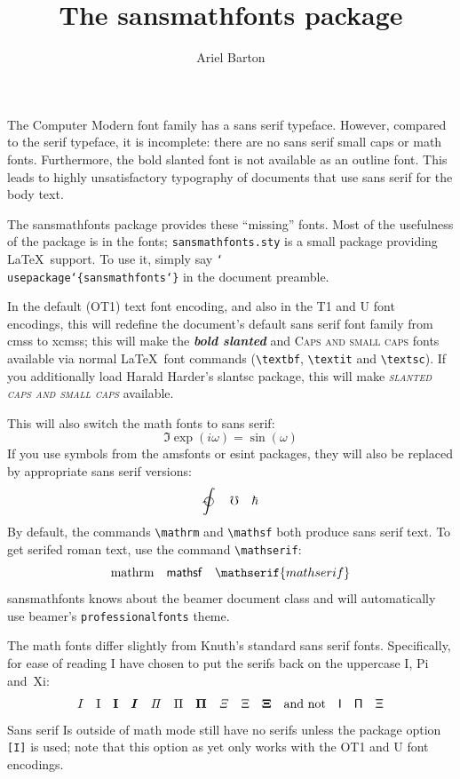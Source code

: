 \documentclass{amsart}
\title{The \textsf{sansmathfonts} package}
\author{Ariel Barton}
\begin{document}
\maketitle



The Computer Modern font family has a sans serif typeface. However, compared to the serif typeface, it is incomplete: there are no sans serif small caps or math fonts. Furthermore, the bold slanted font is not available as an outline font.
This leads to highly unsatisfactory typography of documents that use sans serif for the body text.


The \textsf{sansmathfonts} package provides these ``missing'' fonts. Most of the usefulness of the package is in the fonts; \texttt{sansmathfonts.sty} is a small package providing \LaTeX\ support. To use it, simply say \texttt{\char`\\usepackage\char`\{sansmathfonts\char`\}} in the document preamble.

In the default (OT1) text font encoding, and also in the T1 and U font encodings, this will redefine the document's default sans serif font family from \textsf{cmss} to \textsf{xcmss}; this will make the \textsf{\textbf{\textit{bold slanted}}} and \textsf{\textsc{Caps and small caps}} fonts available via normal \LaTeX\ font commands (\verb|\textbf|, \verb|\textit| and \verb|\textsc|). If you additionally load Harald Harder's \textsf{slantsc} package, this will make \textsf{\textit{\textsc{slanted caps and small caps}}} available.

This will also switch the math fonts to sans serif:
\[\Im \mathop{\mathrm{exp}}(i\omega)=\sin(\omega) \]
If you use symbols from the \textsf{amsfonts} or \textsf{esint} packages, they will also be replaced by appropriate sans serif versions:
\[\ointclockwise \quad \mho \quad \hbar\]
By default, the commands \verb|\mathrm| and \verb|\mathsf| both produce sans serif text. To get serifed roman text, use the command \verb|\mathserif|:
\[\mathrm{mathrm}\quad\mathsf{mathsf}\quad\mathserif{mathserif}\]
\textsf{sansmathfonts} knows about the \textsf{beamer} document class and will automatically use \textsf{beamer}'s \texttt{professionalfonts} theme.

The math fonts differ slightly from Knuth's standard sans serif fonts. Specifically, for ease of reading I have chosen to put the serifs back on the uppercase I, Pi and~Xi:
\[{I}\quad\mathrm{I}\quad\mathbf{I}\quad\bm{I}\quad
\mathit{\Pi}\quad{\Pi}\quad\mathbf{\Pi}\quad
\mathit{\Xi}\quad{\Xi}\quad\mathbf{\Xi}\quad
\text{and not\quad \textsf{\font \rawfont = cmss10 \rawfont I\quad \char5\quad\char4}}\]
\textsf{Sans serif Is outside of math mode} still have no serifs unless the package option \texttt{[I]} is used; note that this option as yet only works with the OT1 and U font encodings.
\end{document}
